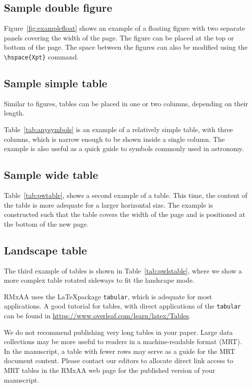 \documentclass[9pt,twoside]{rmaa-rho-class/rmaa-rho}
\begin{document}
            
    \subsection{Sample double figure}

        Figure~\ref{fig:examplefloat} shows an example of a floating figure with two separate panels covering the width of the page. The figure can be placed at the top or bottom of the page. The space between the figures can also be modified using the \verb|\hspace{Xpt}| command.


    \subsection{Sample simple table}

        Similar to figures, tables can be placed in one or two columns, depending on their length.

        Table~\ref{tab:anysymbols} is an example of a relatively simple table, with three columns, which is narrow enough to be shown inside a single column. The example is also useful as a quick guide to symbols commonly used in astronomy.

\subsection{Sample wide table}

        Table~\ref{tab:pwtable}, shows a second example of a table. This time, the content of the table is more adequate for a larger horizontal size. The example is constructed such that the table covers the width of the page and is positioned at the bottom of the new page.

\subsection{Landscape table}
    
 The third example of tables is shown in Table~\ref{tab:pwlstable}, where we show a more complex table rotated sideways to fit the landscape mode. 

 RMxAA uses the \LaTeX package \texttt{tabular}, which is adequate for most applications. A good tutorial for tables, with direct applications of the \texttt{tabular} can be found in \url{https://www.overleaf.com/learn/latex/Tables}. 

 We do not recommend publishing very long tables in your paper. Large data collections may be more useful to readers in a machine-readable format (MRT). In the manuscript, a table with fewer rows may serve as a guide for the MRT document content. Please contact our editors to allocate direct link access to MRT tables in the RMxAA web page for the published version of your manuscript. 
\end{document}
